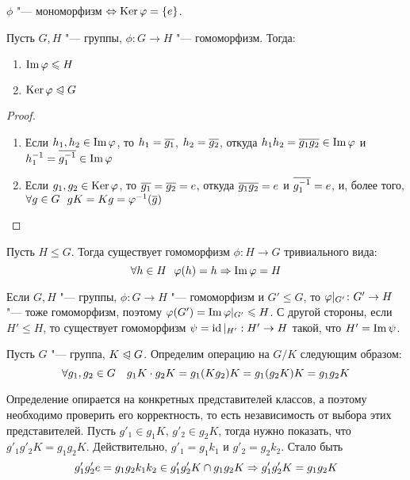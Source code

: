 \begin{corollary}
	$\phi$ "--- мономорфизм $\Leftrightarrow \operatorname{Ker} \varphi = \{e\}$.
\end{corollary}

\begin{proposition}
	Пусть $G, H$ "--- группы, $\phi: G \to H$ "--- гомоморфизм. Тогда:
	\begin{enumerate}
		\item $\operatorname{Im} \varphi \leqslant H$
		\item $\operatorname{Ker} \varphi \trianglelefteqslant G$
	\end{enumerate}
\end{proposition}

\begin{proof}~
	\begin{enumerate}
		\item Если $h_1, h_2 \in \operatorname{Im} \varphi$, то $h_1 = \overline{g_1}$, $h_2 = \overline{g_2}$, откуда $h_1h_2 = \ol{g_1g_2} \hm\in \im \phi$ и $h_1^{-1} = \overline{g_1^{-1}} \in \operatorname{Im} \varphi$
		\item Если $g_1, g_2 \in \operatorname{Ker} \varphi$, то $\overline{g_1} = \overline{g_2} = e$, откуда $\overline{g_1g_2} = e$ и $\overline{g_1^{-1}} = e$, и, более того, $\forall g \in G\ \ gK = Kg = \varphi^{-1}(\overline{g})$
	\end{enumerate}
\end{proof}

\begin{note}
	Пусть $H \le G$. Тогда существует гомоморфизм $\phi \colon H \to G$ тривиального вида:
	\[
		\forall h \in H\ \ \phi(h) = h \ra \im \phi = H
	\]
\end{note}

\begin{note}
	Если $G, H$ "--- группы, $\phi: G \to H$ "--- гомоморфизм и $G' \le G$, то $\phi|_{G'} \colon G' \hm\to H$ "--- тоже гомоморфизм, поэтому $\phi(G') \hm= \im \phi|_{G'} \le H$. С другой стороны, если $H' \le H$, то существует гомоморфизм $\psi = \operatorname{id}|_{H'}: H' \to H$ такой, что $H' = \operatorname{Im}\psi$.
\end{note}

\begin{definition}
	Пусть $G$ "--- группа, $K \trianglelefteqslant G$. Определим операцию на $G / K$ следующим образом:
	\[
		\forall g_1, g_2 \in G \quad g_1K\cdot g_2K \hm= g_1(Kg_2)K = g_1(g_2K)K = g_1g_2K
	\]
\end{definition}

\begin{note}
	Определение опирается на конкретных представителей классов, а поэтому необходимо проверить его корректность, то есть независимость от выбора этих представителей. Пусть $g'_1 \in g_1 K$, $g'_2 \in g_2 K$, тогда нужно показать, что $g'_1 g'_2 K = g_1 g_2 K$. Действительно, $g'_1 = g_1 k_1$ и $g'_2 = g_2 k_2$. Стало быть
	\[
		g'_1 g'_2 e = g_1 g_2 k_1 k_2 \in g'_1 g'_2 K \cap g_1 g_2 K \Rightarrow g'_1 g'_2 K = g_1 g_2 K
	\]
\end{note}

